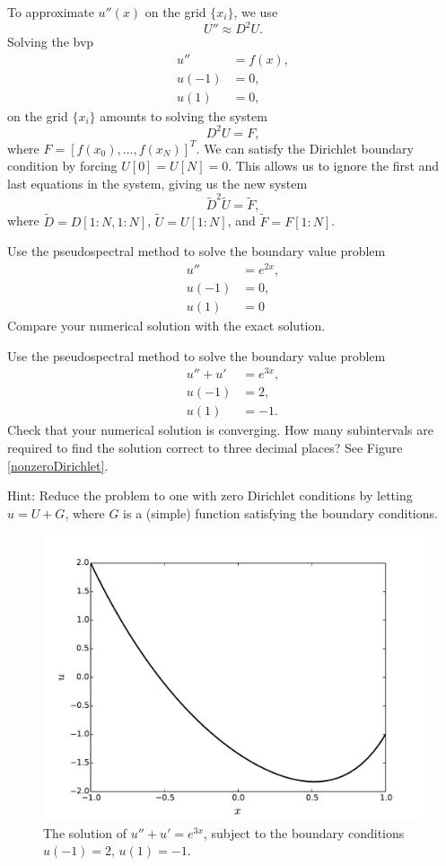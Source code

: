 To approximate $u''(x)$ on the grid $\{x_i\}$, we use 
\[U'' \approx D^2 U.
\]
Solving the bvp
\begin{align*}
u'' &= f(x), \\
u(-1) &= 0, \\
u(1) &= 0,
\end{align*}
on the grid $\{x_i\}$ amounts to solving the system 
\[D^2 U = F,\]
where $F = [f(x_0),\ldots, f(x_N)]^T$. We can satisfy the Dirichlet boundary condition by forcing $U[0] = U[N] = 0$. This allows us to ignore the first and last equations in the system, giving us the new system 
\[\tilde{D}^2 \tilde{U} = \tilde{F},\]
where $\tilde{D} = D[1:N,1:N]$, $\tilde{U} = U[1:N]$, and $\tilde{F} = F[1:N]$.

\begin{problem}
	Use the pseudospectral method to solve the boundary value problem 
	\begin{align*}
	u'' &= e^{2x}, \\
	u(-1) &= 0, \\
	u(1) &= 0
	\end{align*}
	Compare your numerical solution with the exact solution.
\end{problem}


\begin{problem}
	Use the pseudospectral method to solve the boundary value problem 
	\begin{align*}
	u'' + u' &= e^{3x}, \\
	u(-1) &= 2, \\
	u(1) &= -1.
	\end{align*}
	Check that your numerical solution is converging. How many subintervals are required to find the solution correct to three decimal places? See Figure \eqref{nonzeroDirichlet}.
	
	Hint: Reduce the problem to one with zero Dirichlet conditions by letting $u = U+G$, where $G$ is a (simple) function satisfying the boundary conditions.
\end{problem}

\begin{figure}[ht]
\centering
\includegraphics[width=12cm]{nonzeroDirichlet.pdf}
\caption{The solution of $u'' + u' = e^{3x}$, subject to the boundary conditions 
$u(-1) = 2$, $u(1) = -1$.
 }
\label{nonzeroDirichlet}
\end{figure}

